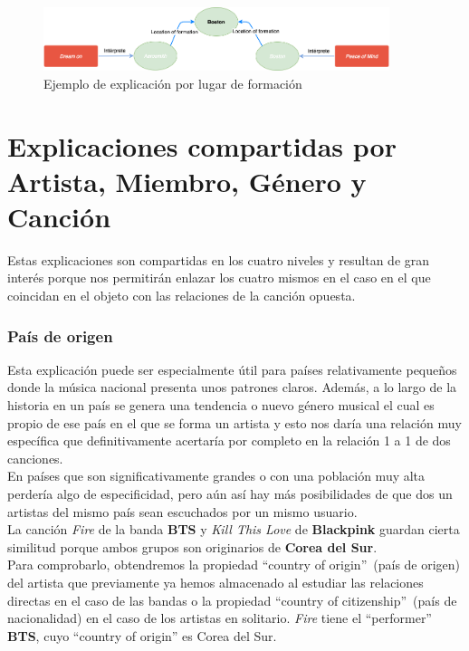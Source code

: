 \begin{figure}[h!]
	\centering
	\includegraphics[width = 0.9\textwidth]{Imagenes/Bitmap/LocationOfFormation.png}
	\caption{Ejemplo de explicación por lugar de formación}
	\label{fig:sampleImage}
\end{figure}

\section{Explicaciones compartidas por Artista, Miembro, Género y Canción}

Estas explicaciones son compartidas en los cuatro niveles y resultan de gran interés porque nos permitirán enlazar los cuatro mismos en el caso en el que coincidan en el objeto con las relaciones de la canción opuesta.\\

\subsubsection*{País de origen}

Esta explicación puede ser especialmente útil para países relativamente pequeños donde la música nacional presenta unos patrones claros. Además, a lo largo de la historia en un país se genera una tendencia o nuevo género musical el cual es propio de ese país en el que se forma un artista y esto nos daría una relación muy específica que definitivamente acertaría por completo en la relación 1 a 1 de dos canciones.\\

En países que son significativamente grandes o con una población muy alta perdería algo de especificidad, pero aún así hay más posibilidades de que dos un artistas del mismo país sean escuchados por un mismo usuario.\\

La canción \textit{Fire} de la banda \textbf{BTS} y \textit{Kill This Love} de \textbf{Blackpink} guardan cierta similitud porque ambos grupos son originarios de \textbf{Corea del Sur}.\\

Para comprobarlo, obtendremos la propiedad ``country of origin''~(país de origen) del artista que previamente ya hemos almacenado al estudiar las relaciones directas en el caso de las bandas o la propiedad ``country of citizenship''~(país de nacionalidad) en el caso de los artistas en solitario. \textit{Fire} tiene el ``performer'' \textbf{BTS}, cuyo ``country of origin'' es Corea del Sur.\\

